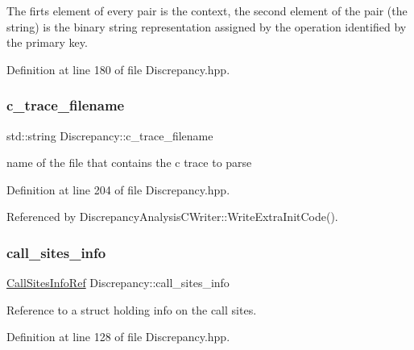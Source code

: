 The firts element of every pair is the context, the second element of the pair (the string) is the binary string representation assigned by the operation identified by the primary key. 

Definition at line 180 of file Discrepancy.\+hpp.

\mbox{\label{structDiscrepancy_a9a9f2847e0060eaf86f97162ee66d865}} 
\subsubsection{\texorpdfstring{c\+\_\+trace\+\_\+filename}{c\_trace\_filename}}
{\footnotesize\ttfamily std\+::string Discrepancy\+::c\+\_\+trace\+\_\+filename}



name of the file that contains the c trace to parse 



Definition at line 204 of file Discrepancy.\+hpp.



Referenced by Discrepancy\+Analysis\+C\+Writer\+::\+Write\+Extra\+Init\+Code().

\mbox{\label{structDiscrepancy_ab6c0caf5016e197a993fecb5712c8d10}} 
\subsubsection{\texorpdfstring{call\+\_\+sites\+\_\+info}{call\_sites\_info}}
{\footnotesize\ttfamily \hyperlink{Discrepancy_8hpp_aa1d62da21f69dae54811e632cadaf6b2}{Call\+Sites\+Info\+Ref} Discrepancy\+::call\+\_\+sites\+\_\+info}



Reference to a struct holding info on the call sites. 



Definition at line 128 of file Discrepancy.\+hpp.

\mbox{\label{structDiscrepancy_a0deb6094e1991bebff7fd36ef2704458}} 
